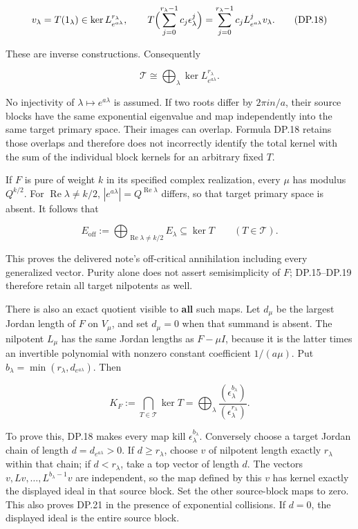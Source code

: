 \documentclass{article}
\begin{document}
\[
v_\lambda=T(1_\lambda)\in
 \ker L_{e^{a\lambda}}^{r_\lambda},
\qquad
T\Bigl(\sum_{j=0}^{r_\lambda-1}c_j\epsilon_\lambda^j\Bigr)
=\sum_{j=0}^{r_\lambda-1}c_jL_{e^{a\lambda}}^jv_\lambda.
\tag{DP.18}
\]

These are inverse constructions. Consequently

\[
\mathscr T\cong
\bigoplus_\lambda\ker L_{e^{a\lambda}}^{r_\lambda}.
\tag{DP.19}
\]

No injectivity of \(\lambda\mapsto e^{a\lambda}\) is assumed. If two roots differ by \(2\pi i n/a\), their source blocks have the same exponential eigenvalue and map independently into the same target primary space. Their images can overlap. Formula DP.18 retains those overlaps and therefore does not incorrectly identify the total kernel with the sum of the individual block kernels for an arbitrary fixed \(T\).

If \(F\) is pure of weight \(k\) in its specified complex realization, every \(\mu\) has modulus \(Q^{k/2}\). For \(\operatorname{Re}\lambda\ne k/2\), \(|e^{a\lambda}|=Q^{\operatorname{Re}\lambda}\) differs, so that target primary space is absent. It follows that

\[
E_{\mathrm{off}}:=\bigoplus_{\operatorname{Re}\lambda\ne k/2}E_\lambda
\subseteq\ker T
\qquad(T\in\mathscr T).
\tag{DP.20}
\]

This proves the delivered note's off-critical annihilation including every generalized vector. Purity alone does not assert semisimplicity of \(F\); DP.15--DP.19 therefore retain all target nilpotents as well.

There is also an exact quotient visible to \textbf{all} such maps. Let \(d_\mu\) be the largest Jordan length of \(F\) on \(V_\mu\), and set \(d_\mu=0\) when that summand is absent. The nilpotent \(L_\mu\) has the same Jordan lengths as \(F-\mu I\), because it is the latter times an invertible polynomial with nonzero constant coefficient \(1/(a\mu)\). Put \(b_\lambda=\min(r_\lambda,d_{e^{a\lambda}})\). Then

\[
K_F:=\bigcap_{T\in\mathscr T}\ker T
=\bigoplus_\lambda
 \frac{(\epsilon_\lambda^{b_\lambda})}
      {(\epsilon_\lambda^{r_\lambda})}.
\tag{DP.21}
\]

To prove this, DP.18 makes every map kill \(\epsilon_\lambda^{b_\lambda}\). Conversely choose a target Jordan chain of length \(d=d_{e^{a\lambda}}>0\). If \(d\ge r_\lambda\), choose \(v\) of nilpotent length exactly \(r_\lambda\) within that chain; if \(d<r_\lambda\), take a top vector of length \(d\). The vectors \(v,Lv,\ldots,L^{b_\lambda-1}v\) are independent, so the map defined by this \(v\) has kernel exactly the displayed ideal in that source block. Set the other source-block maps to zero. This also proves DP.21 in the presence of exponential collisions. If \(d=0\), the displayed ideal is the entire source block.
\end{document}
